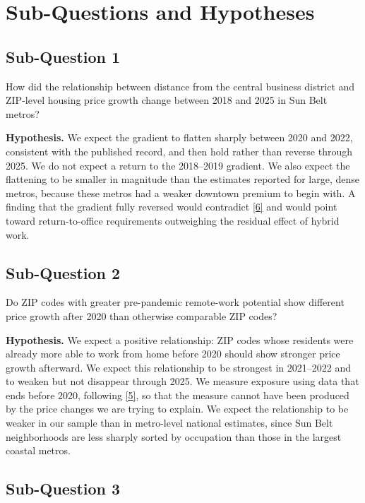 \documentclass[11pt]{article}
\newcommand{\refl}[2]{\href{#2}{[#1]}}
\newcommand{\uMond}{https://www.nber.org/papers/w30041}
\newcommand{\uPnas}{https://doi.org/10.1073/pnas.2408930121}
\begin{document}
\section{Sub-Questions and Hypotheses}

\subsection{Sub-Question 1}

How did the relationship between distance from the central business district and
ZIP-level housing price growth change between 2018 and 2025 in Sun Belt metros?

\textbf{Hypothesis.} We expect the gradient to flatten sharply between 2020 and
2022, consistent with the published record, and then hold rather than reverse
through 2025. We do not expect a return to the 2018--2019 gradient. We also
expect the flattening to be smaller in magnitude than the estimates reported for
large, dense metros, because these metros had a weaker downtown premium to begin
with. A finding that the gradient fully reversed would contradict
\refl{6}{\uPnas} and would point toward return-to-office requirements outweighing
the residual effect of hybrid work.

\subsection{Sub-Question 2}

Do ZIP codes with greater pre-pandemic remote-work potential show different price
growth after 2020 than otherwise comparable ZIP codes?

\textbf{Hypothesis.} We expect a positive relationship: ZIP codes whose residents
were already more able to work from home before 2020 should show stronger price
growth afterward. We expect this relationship to be strongest in 2021--2022 and
to weaken but not disappear through 2025. We measure exposure using data that
ends before 2020, following \refl{5}{\uMond}, so that the measure cannot have
been produced by the price changes we are trying to explain. We expect the
relationship to be weaker in our sample than in metro-level national estimates,
since Sun Belt neighborhoods are less sharply sorted by occupation than those in
the largest coastal metros.

\subsection{Sub-Question 3}
\end{document}
